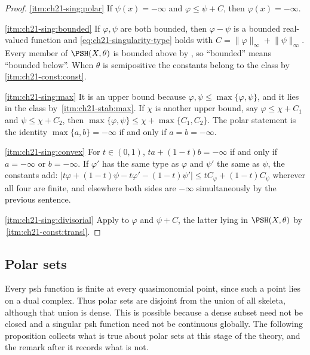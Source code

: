 \begin{proof}
\cref{itm:ch21-sing:polar}  If $\psi(x)=-\infty$ and
$\varphi\leq\psi+C$, then $\varphi(x)=-\infty$.

\cref{itm:ch21-sing:bounded}  If $\varphi,\psi$ are both bounded, then
$\varphi-\psi$ is a bounded real-valued function and
\eqref{eq:ch21-singularity-type} holds with $C=\lVert\varphi\rVert_\infty
+\lVert\psi\rVert_\infty$.  Every member of $\PSH(X,\theta)$ is bounded
above by , so ``bounded'' means ``bounded
below''.  When $\theta$ is semipositive the constants belong to the class
by \,\cref{itm:ch21-const:const}.

\cref{itm:ch21-sing:max}  It is an upper bound because
$\varphi,\psi\leq\max\{\varphi,\psi\}$, and it lies in the class by
\,\cref{itm:ch21-stab:max}.  If $\chi$ is another
upper bound, say $\varphi\leq\chi+C_1$ and $\psi\leq\chi+C_2$, then
$\max\{\varphi,\psi\}\leq\chi+\max\{C_1,C_2\}$.  The polar statement is
the identity $\max\{a,b\}=-\infty$ if and only if $a=b=-\infty$.

\cref{itm:ch21-sing:convex}  For $t\in(0,1)$, $t a+(1-t)b=-\infty$ if and
only if $a=-\infty$ or $b=-\infty$.  If $\varphi'$ has the same type
as $\varphi$ and $\psi'$ the same as $\psi$, the constants add:
$|t\varphi+(1-t)\psi-t\varphi'-(1-t)\psi'|\leq tC_\varphi+(1-t)C_\psi$
wherever all four are finite, and elsewhere both sides are $-\infty$
simultaneously by the previous sentence.

\cref{itm:ch21-sing:divisorial}  Apply
 to $\varphi$ and $\psi+C$, the latter
lying in $\PSH(X,\theta)$ by
\,\cref{itm:ch21-const:transl}.
\end{proof}

\subsection{Polar sets}
\label{sec:ch21-polar}

Every psh function is finite at every quasimonomial point, since such a
point lies on a dual complex.  Thus polar sets are disjoint from the union
of all skeleta, although that union is dense.  This is possible because a
dense subset need not be closed and a singular psh function need not be
continuous globally.  The following proposition collects what is true about
polar sets at this stage of the theory, and the remark after it records what
is not.

